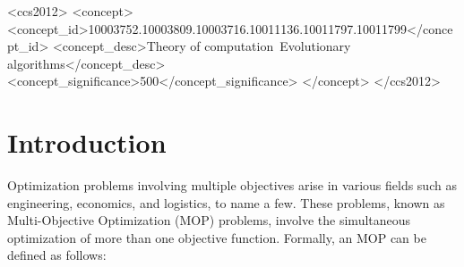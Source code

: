 \documentclass[sigconf]{acmart}
\begin{document}
\begin{abstract}
  A clear and well-documented \LaTeX\ document is presented as an
  article formatted for publication by ACM in a conference proceedings
  or journal publication. Based on the ``acmart'' document class, this
  article presents and explains many of the common variations, as well
  as many of the formatting elements an author may use in the
  preparation of the documentation of their work.
\end{abstract}


\begin{CCSXML}
  <ccs2012>
  <concept>
  <concept_id>10003752.10003809.10003716.10011136.10011797.10011799</concept_id>
  <concept_desc>Theory of computation~Evolutionary algorithms</concept_desc>
  <concept_significance>500</concept_significance>
  </concept>
  </ccs2012>
\end{CCSXML}





\maketitle


\section{Introduction}
Optimization problems involving multiple objectives arise in various fields such as engineering, economics, and logistics, to name a few. These problems, known as Multi-Objective Optimization (MOP) problems, involve the simultaneous optimization of more than one objective function. Formally, an MOP can be defined as follows:
\end{document}
